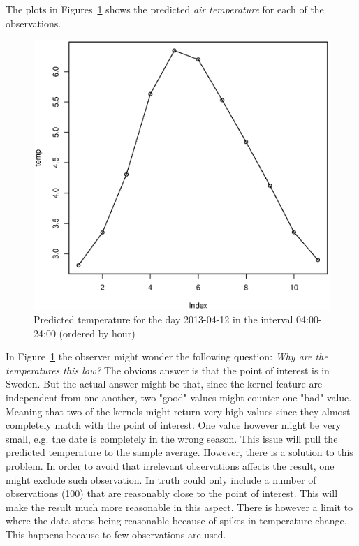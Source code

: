 \documentclass[a4paper, twocolumn]{article}
\begin{document}
    The plots in Figures~\ref{fig:result} shows the predicted \textit{air temperature} for each of the observations. 
    \begin{figure}[H]
    \centering
    \caption{Predicted temperature for the day 2013-04-12 in the interval 04:00-24:00 (ordered by hour)\label{fig:result}}
	    \begin{minipage}[]{0.4\textwidth}
	    	\includegraphics[width=\textwidth]{share/result.eps}
	    \end{minipage}
    \end{figure}

	In Figure~\ref{fig:result} the observer might wonder the following question: \textit{Why are the temperatures this low?}\newline
    The obvious answer is that the point of interest is in Sweden. But the actual answer might be that, since the kernel feature are independent from one another, two "good" values might counter one "bad" value. Meaning that two of the kernels might return very high values since they almost completely match with the point of interest. One value however might be very small, e.g. the date is completely in the wrong season. This issue will pull the predicted temperature to the sample average. However, there is a solution to this problem. In order to avoid that irrelevant observations affects the result, one might exclude such observation. In truth could only include a number of observations (100) that are reasonably close to the point of interest. This will make the result much more reasonable in this aspect. There is however a limit to where the data stops being reasonable because of spikes in temperature change. This happens because to few observations are used.
\end{document}
